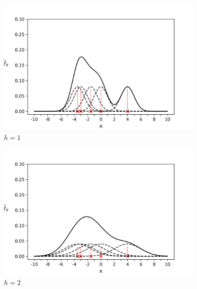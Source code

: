 \begin{figure}[H]
\includegraphics[width=0.9\textwidth]{img/h_1}
\caption{$h=1$ \cite{Fra}}
\end{figure}

\begin{figure}[H]
\includegraphics[width=0.9\textwidth]{img/h_2}
\caption{$h=2$ \cite{Fra}}
\end{figure}